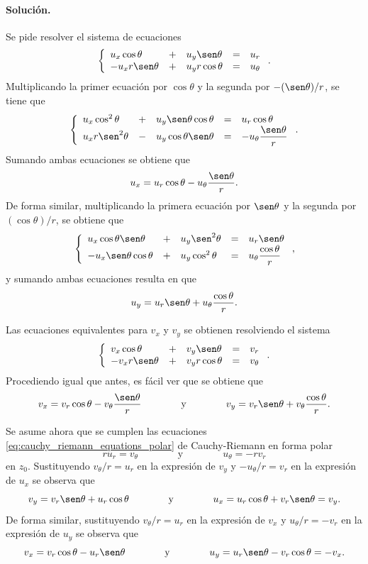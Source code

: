\documentclass[a4paper]{report}
\begin{document}
\paragraph{Solución.} Se pide resolver el sistema de ecuaciones
\[
 \left\{ 
 \begin{array}{lllll}
  u_x\cos\theta&+&u_y\sen\theta&=&u_r\\
 -u_xr\sen\theta&+&u_yr\cos\theta&=&u_\theta
 \end{array}
 \right..
\]
Multiplicando la primer ecuación por \(\cos\theta\) y la segunda por \(-(\sen\theta)/r\), se tiene que 
\[
 \left\{ 
 \begin{array}{lllll}
  u_x\cos^2\theta&+&u_y\sen\theta\cos\theta&=&u_r\cos\theta\\
 u_xr\sen^2\theta&-&u_y\cos\theta\sen\theta&=&-u_\theta\dfrac{\sen\theta}{r}
 \end{array}
 \right..
\]
Sumando ambas ecuaciones se obtiene que 
\[
 u_x=u_r\cos\theta-u_\theta\frac{\sen\theta}{r}.
\]
De forma similar, multiplicando la primera ecuación por \(\sen\theta\) y la segunda por \((\cos\theta)/r\), se obtiene que 
\[
 \left\{ 
 \begin{array}{lllll}
  u_x\cos\theta\sen\theta&+&u_y\sen^2\theta&=&u_r\sen\theta\\
 -u_x\sen\theta\cos\theta&+&u_y\cos^2\theta&=&u_\theta\dfrac{\cos\theta}{r}
 \end{array}
 \right.,
\]
y sumando ambas ecuaciones resulta en que 
\[
 u_y=u_r\sen\theta+u_\theta\frac{\cos\theta}{r}.
\]

Las ecuaciones equivalentes para \(v_x\) y \(v_y\) se obtienen resolviendo el sistema
\[
 \left\{ 
 \begin{array}{lllll}
  v_x\cos\theta&+&v_y\sen\theta&=&v_r\\
  -v_xr\sen\theta&+&v_yr\cos\theta&=&v_\theta
 \end{array}
 \right..
\]
Procediendo igual que antes, es fácil ver que se obtiene que
\begin{equation}\label{eq:polar_coordinates_partial_derivatives_v_inverse}
 v_x=v_r\cos\theta-v_\theta\frac{\sen\theta}{r}
 \qquad\qquad\textrm{y}\qquad\qquad
 v_y=v_r\sen\theta+v_\theta\frac{\cos\theta}{r}. 
\end{equation}

Se asume ahora que se cumplen las ecuaciones \ref{eq:cauchy_riemann_equations_polar} de Cauchy-Riemann en forma polar
\[
 ru_r=v_\theta 
 \qquad\qquad\textrm{y}\qquad\qquad
 u_\theta=-rv_r
\]
en \(z_0\). Sustituyendo \(v_\theta/r=u_r\) en la expresión de \(v_y\) y \(-u_\theta/r=v_r\) en la expresión de \(u_x\) se observa que 
\[
 v_y=v_r\sen\theta+u_r\cos\theta
 \qquad\qquad\textrm{y}\qquad\qquad
 u_x=u_r\cos\theta+v_r\sen\theta=v_y.
\]
De forma similar, sustituyendo \(v_\theta/r=u_r\) en la expresión de \(v_x\) y \(u_\theta/r=-v_r\) en la expresión de \(u_y\) se observa que 
\[
 v_x=v_r\cos\theta-u_r\sen\theta
 \qquad\qquad\textrm{y}\qquad\qquad
 u_y=u_r\sen\theta-v_r\cos\theta=-v_x.
\]
\end{document}
